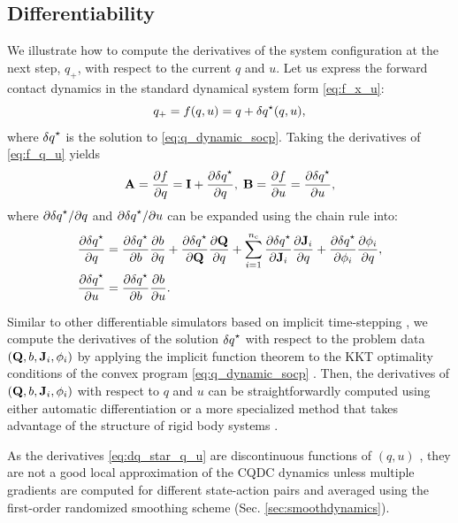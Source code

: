 \subsection{Differentiability} \label{sec:quasi_dynamic_derivatives}
We illustrate how to compute the derivatives of the system configuration at the next step, $q_+$, with respect to the current $q$ and $u$. Let us express the forward contact dynamics in the standard dynamical system form \eqref{eq:f_x_u}:
\begin{equation}
\label{eq:f_q_u}
q_+ = f(q, u) = q + {\delta q}^\star(q, u),
\end{equation}
where ${\delta q}^\star$ is the solution to  \eqref{eq:q_dynamic_socp}. Taking the derivatives of \eqref{eq:f_q_u} yields
\begin{equation}
\label{eq:q_dynamics_AB}
\mathbf{A} = \frac{\partial {f}}{\partial {q}} = \mathbf{I} + \frac{\partial {{\delta q}^\star}}{\partial {q}}, \;
\mathbf{B} = \frac{\partial {f}}{\partial {u}} = \frac{\partial {{\delta q}^\star}}{\partial {u}},
\end{equation}
where $\partial {{\delta q}^\star} / \partial {q}$ and $\partial {{\delta q}^\star} / \partial {u}$ can be expanded using the chain rule into:
\begin{subequations}
\label{eq:dq_star_q_u}
\begin{align}
\frac{\partial {{\delta q}^\star}}{\partial {q}} &= \frac{\partial {{\delta q}^\star}}{\partial {b}} \frac{\partial {b}}{\partial {q}} + \frac{\partial {{\delta q}^\star}}{\partial {\mathbf{Q}}}\frac{\partial {\mathbf{Q}}}{\partial {q}} + \sum_{i=1}^{n_\mathrm{c}} \frac{\partial {{\delta q}^\star}}{\partial {\mathbf{J}_i}}\frac{\partial {\mathbf{J}_i}}{\partial {q}} + \frac{\partial {{\delta q}^\star}}{\partial {\phi_i}}\frac{\partial {\phi_i}}{\partial {q}}, \label{eq:DdqDq}\\
\frac{\partial {{\delta q}^\star}}{\partial {u}} &= \frac{\partial {{\delta q}^\star}}{\partial {b}} \frac{\partial {b}}{\partial {u}}. \label{eq:DdqDu}
\end{align}
\end{subequations}

Similar to other differentiable simulators based on implicit time-stepping \cite{werling2021fast, howell2022dojo}, we compute the derivatives of the solution ${\delta q}^\star$ with respect to the problem data $(\mathbf{Q}, b, \mathbf{J}_i, \phi_i)$ by applying the implicit function theorem to the KKT optimality conditions of the convex program \eqref{eq:q_dynamic_socp} \cite{agrawal2019differentiatingcone}. 
Then, the derivatives of $(\mathbf{Q}, b, \mathbf{J}_i, \phi_i)$ with respect to $q$ and $u$ can be straightforwardly computed using either automatic differentiation or a more specialized method that takes advantage of the structure of rigid body systems \cite{carpentier2018analytical}.

As the derivatives \eqref{eq:dq_star_q_u} are discontinuous functions of $(q, u)$ \cite{bundledgradients}, they are not a good local approximation of the CQDC dynamics unless multiple gradients are computed for different state-action pairs and averaged using the first-order randomized smoothing scheme (Sec. \ref{sec:smoothdynamics}).

